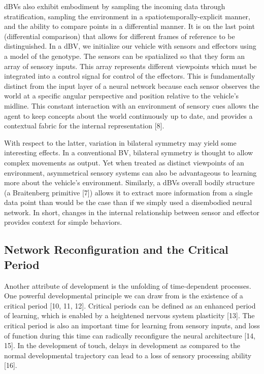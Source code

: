 \documentclass{article}
\begin{document}
dBVs also exhibit embodiment by sampling the incoming data through stratification, sampling the environment in a spatiotemporally-explicit manner, and the ability to compare points in a differential manner. It is on the last point (differential comparison) that allows for different frames of reference to be distinguished. In a dBV, we initialize our vehicle with sensors and effectors using a model of the genotype. The sensors can be spatialized so that they form an array of sensory inputs. This array represents different viewpoints which must be integrated into a control signal for control of the effectors. This is fundamentally distinct from the input layer of a neural network because each sensor observes the world at a specific angular perspective and position relative to the vehicle’s midline. This constant interaction with an environment of sensory cues allows the agent to keep concepts about the world continuously up to date, and provides a contextual fabric for the internal representation [8].

With respect to the latter, variation in bilateral symmetry may yield some interesting effects. In a conventional BV, bilateral symmetry is thought to allow complex movements as output. Yet when treated as distinct viewpoints of an environment, asymmetrical sensory systems can also be advantageous to learning more about the vehicle’s environment. Similarly, a dBVs overall bodily structure (a Braitenberg primitive [7]) allows it to extract more information from a single data point than would be the case than if we simply used a disembodied neural network. In short, changes in the internal relationship between sensor and effector provides context for simple behaviors.

\subsection{Network Reconfiguration and the Critical Period}

Another attribute of development is the unfolding of time-dependent processes. One powerful developmental principle we can draw from is the existence of a critical period [10, 11, 12]. Critical periods can be defined as an enhanced period of learning, which is enabled by a heightened nervous system plasticity [13]. The critical period is also an important time for learning from sensory inputs, and loss of function during this time can radically reconfigure the neural architecture [14, 15]. In the development of touch, delays in development as compared to the normal developmental trajectory can lead to a loss of sensory processing ability [16].
\end{document}
